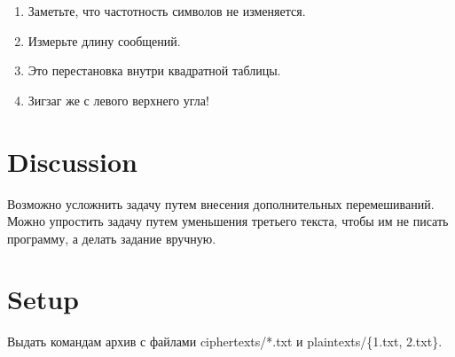 \documentclass{article}
\begin{document}
\begin{enumerate}
\item Заметьте, что частотность символов не изменяется.
\item Измерьте длину сообщений.
\item Это перестановка внутри квадратной таблицы.
\item Зигзаг же с левого верхнего угла!
\end{enumerate}

\section{Discussion}

Возможно усложнить задачу путем внесения дополнительных перемешиваний. Можно упростить задачу путем уменьшения третьего текста, чтобы им не писать программу, а делать задание вручную.

\section{Setup}

Выдать командам архив с файлами ciphertexts/*.txt и plaintexts/\{1.txt, 2.txt\}.
\end{document}

